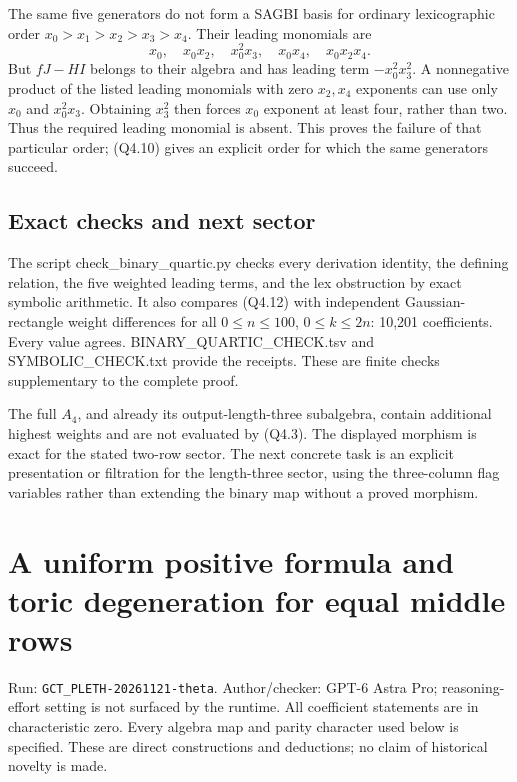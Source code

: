 \documentclass[
  10pt,
]{article}
\begin{document}
The same five generators do not form a SAGBI basis for ordinary
lexicographic order \(x_0>x_1>x_2>x_3>x_4\). Their leading monomials are
\[
x_0,\quad x_0x_2,\quad x_0^2x_3,\quad x_0x_4,\quad x_0x_2x_4.
\] But \(fJ-HI\) belongs to their algebra and has leading term
\(-x_0^2x_3^2\). A nonnegative product of the listed leading monomials
with zero \(x_2,x_4\) exponents can use only \(x_0\) and \(x_0^2x_3\).
Obtaining \(x_3^2\) then forces \(x_0\) exponent at least four, rather
than two. Thus the required leading monomial is absent. This proves the
failure of that particular order; (Q4.10) gives an explicit order for
which the same generators succeed.

\subsection{Exact checks and next
sector}\label{exact-checks-and-next-sector}

The script check\_binary\_quartic.py checks every derivation identity,
the defining relation, the five weighted leading terms, and the lex
obstruction by exact symbolic arithmetic. It also compares (Q4.12) with
independent Gaussian-rectangle weight differences for all
\(0\le n\le100\), \(0\le k\le2n\): 10,201 coefficients. Every value
agrees. BINARY\_QUARTIC\_CHECK.tsv and SYMBOLIC\_CHECK.txt provide the
receipts. These are finite checks supplementary to the complete proof.

The full \(A_4\), and already its output-length-three subalgebra,
contain additional highest weights and are not evaluated by (Q4.3). The
displayed morphism is exact for the stated two-row sector. The next
concrete task is an explicit presentation or filtration for the
length-three sector, using the three-column flag variables rather than
extending the binary map without a proved morphism.

\section{A uniform positive formula and toric degeneration for equal
middle
rows}\label{a-uniform-positive-formula-and-toric-degeneration-for-equal-middle-rows}

Run:
\texttt{\small GCT\_\allowbreak{}PLETH-\allowbreak{}20261121-\allowbreak{}theta}.
Author/checker: GPT-6 Astra Pro; reasoning-effort setting is not
surfaced by the runtime. All coefficient statements are in
characteristic zero. Every algebra map and parity character used below
is specified. These are direct constructions and deductions; no claim of
historical novelty is made.
\end{document}
